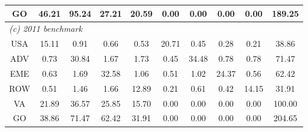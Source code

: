 \begin{table}[p]
\begin{center}
\begin{tabular}{cccccccccc}
GO& 46.21& 95.24& 27.21& 20.59& 0.00& 0.00& 0.00& 0.00& 189.25\\
\midrule
\multicolumn{10}{l}{\textit{(c) 2011 benchmark}}\\
USA& 15.11& 0.91& 0.66& 0.53& 20.71& 0.45& 0.28& 0.21& 38.86 \\
ADV& 0.73& 30.84& 1.67& 1.73& 0.45& 34.48& 0.78& 0.78& 71.47 \\
EME& 0.63& 1.69& 32.58& 1.06& 0.51& 1.02& 24.37& 0.56& 62.42 \\
ROW& 0.51& 1.46& 1.66& 12.89& 0.21& 0.61& 0.42& 14.15& 31.91 \\
VA& 21.89& 36.57& 25.85& 15.70& 0.00& 0.00& 0.00& 0.00& 100.00\\
GO& 38.86& 71.47& 62.42& 31.91& 0.00& 0.00& 0.00& 0.00& 204.65\\
\bottomrule
\end{tabular}
\normalsize
\end{center}
\end{table}
